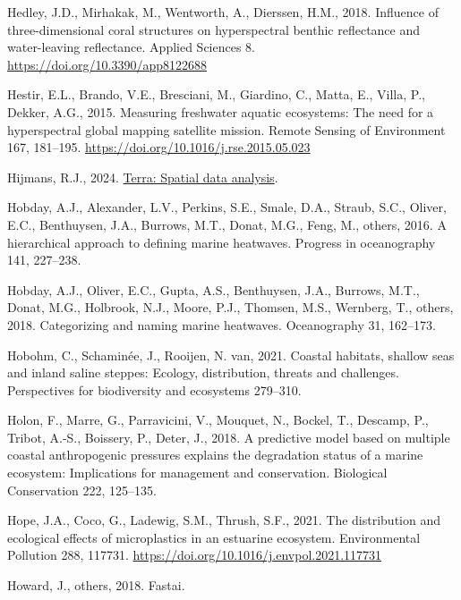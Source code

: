 \documentclass[
  letterpaper,
  11pt,
  english,
  singlespacing,
  headsepline]{MastersDoctoralThesis}
\newlength{\cslhangindent}
\newenvironment{CSLReferences}[2] %
 {\begin{list}{}{%
  \setlength{\itemindent}{0pt}
  \setlength{\leftmargin}{0pt}
  \setlength{\parsep}{0pt}
  \ifodd #1
   \setlength{\leftmargin}{\cslhangindent}
   \setlength{\itemindent}{-1\cslhangindent}
  \fi
  \setlength{\itemsep}{#2\baselineskip}}}
 {\end{list}}
\begin{document}
\begin{CSLReferences}{1}{0}
Hedley, J.D., Mirhakak, M., Wentworth, A., Dierssen, H.M., 2018.
Influence of three-dimensional coral structures on hyperspectral benthic
reflectance and water-leaving reflectance. Applied Sciences 8.
\url{https://doi.org/10.3390/app8122688}

Hestir, E.L., Brando, V.E., Bresciani, M., Giardino, C., Matta, E.,
Villa, P., Dekker, A.G., 2015. {Measuring freshwater aquatic ecosystems:
The need for a hyperspectral global mapping satellite mission}. Remote
Sensing of Environment 167, 181--195.
\url{https://doi.org/10.1016/j.rse.2015.05.023}

Hijmans, R.J., 2024.
\href{https://CRAN.R-project.org/package\%20=\%20terra}{Terra: Spatial
data analysis}.

Hobday, A.J., Alexander, L.V., Perkins, S.E., Smale, D.A., Straub, S.C.,
Oliver, E.C., Benthuysen, J.A., Burrows, M.T., Donat, M.G., Feng, M.,
others, 2016. A hierarchical approach to defining marine heatwaves.
Progress in oceanography 141, 227--238.

Hobday, A.J., Oliver, E.C., Gupta, A.S., Benthuysen, J.A., Burrows,
M.T., Donat, M.G., Holbrook, N.J., Moore, P.J., Thomsen, M.S., Wernberg,
T., others, 2018. Categorizing and naming marine heatwaves. Oceanography
31, 162--173.

Hobohm, C., Schaminée, J., Rooijen, N. van, 2021. Coastal habitats,
shallow seas and inland saline steppes: Ecology, distribution, threats
and challenges. Perspectives for biodiversity and ecosystems 279--310.

Holon, F., Marre, G., Parravicini, V., Mouquet, N., Bockel, T., Descamp,
P., Tribot, A.-S., Boissery, P., Deter, J., 2018. A predictive model
based on multiple coastal anthropogenic pressures explains the
degradation status of a marine ecosystem: Implications for management
and conservation. Biological Conservation 222, 125--135.

Hope, J.A., Coco, G., Ladewig, S.M., Thrush, S.F., 2021. {The
distribution and ecological effects of microplastics in an estuarine
ecosystem}. Environmental Pollution 288, 117731.
\url{https://doi.org/10.1016/j.envpol.2021.117731}

Howard, J., others, 2018. Fastai.


\end{CSLReferences}
\end{document}
